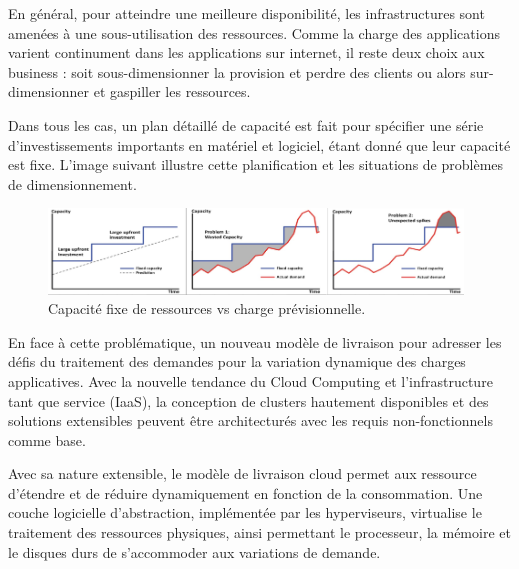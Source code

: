 En général, pour atteindre une meilleure disponibilité, les infrastructures sont amenées à une sous-utilisation des ressources. Comme la charge des applications varient continument dans les applications sur internet, il reste deux choix aux business : soit sous-dimensionner la provision et perdre des clients ou alors sur-dimensionner et gaspiller les ressources. 

Dans tous les cas, un plan détaillé de capacité est fait pour spécifier une série d'investissements importants en matériel et logiciel, étant donné que leur capacité est fixe. L'image suivant illustre cette planification et les situations de problèmes de dimensionnement.


\begin{figure}[h]
\begin{center}
\includegraphics[width=0.98\textwidth]{images/fixed_capacity_load_prediction} 
\caption{Capacité fixe de ressources vs charge prévisionnelle. \cite{awsScaling}}
\end{center}
\end{figure}

En face à cette problématique, un nouveau modèle de livraison pour adresser les défis du traitement des demandes pour la variation dynamique des charges applicatives. Avec la nouvelle tendance du Cloud Computing et l'infrastructure tant que service (IaaS), la conception de clusters hautement disponibles et des solutions extensibles peuvent être architecturés avec les requis non-fonctionnels comme base. 

Avec sa nature extensible, le modèle de livraison cloud permet aux ressource d'étendre et de réduire  dynamiquement en fonction de la consommation. Une couche logicielle d'abstraction, implémentée par les hyperviseurs, virtualise le traitement des ressources physiques, ainsi permettant le processeur, la mémoire et le disques durs de s'accommoder aux variations de demande. \cite{awsScaling} \cite{journeySDDC}

